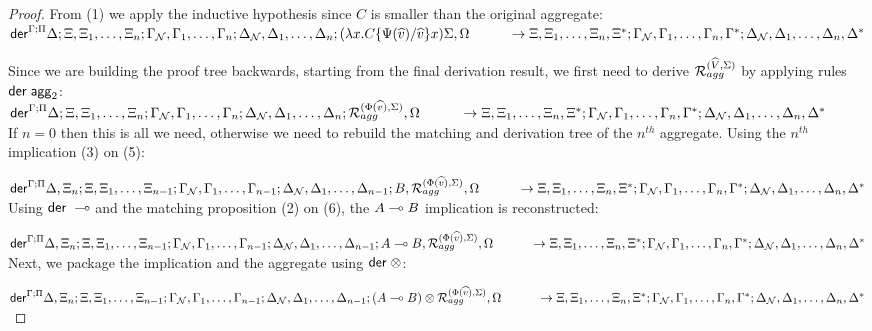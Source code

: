 \begin{proof}
\noindent From (1) we apply the inductive hypothesis since $C$ is smaller than
the original aggregate:\\
$\dz{\Gamma}{\Pi}{\Delta}{\Xi, \Xi_1, \dotsc, \Xi_n}{\gammanew, \Gamma_1,
\dotsc, \Gamma_n}{\deltanew, \Delta_1, \dotsc, \Delta_n}{
   (\lambda x.  C\{\Psi(\widehat{v})/\widehat{v}\} x) \Sigma,
   \Omega\\ \hspace*{1cm}}{\aggoutsem}$

\noindent Since we are building the proof tree backwards, starting from the final
derivation result, we first need to derive $\defstwo{agg}{\widehat{V}}{\Sigma}$ by applying rules
$\dzname \m{agg}_2$:\\
$\dz{\Gamma}{\Pi}{\Delta}{\Xi, \Xi_1, \dotsc, \Xi_n}{\gammanew, \Gamma_1,
\dotsc, \Gamma_n}{\deltanew, \Delta_1, \dotsc, \Delta_n}
{\defstwo{agg}{\Phi(\widehat{v})}{\Sigma}, \Omega \\ \hspace*{1cm}}{\aggoutsem}$ \\

\noindent If $n = 0$ then this is all we need, otherwise
we need to rebuild the matching and derivation tree of the
$n^{th}$ aggregate.  Using the $n^{th}$ implication (3) on (5):

\noindent $\dz{\Gamma}{\Pi}{\Delta, \Xi_n}{\Xi, \Xi_1, \dotsc, \Xi_{n-1}}{\gammanew, \Gamma_1,
\dotsc, \Gamma_{n-1}}{\deltanew, \Delta_1, \dotsc, \Delta_{n-1}}{B, \defstwo{agg}{\Phi(\widehat{v})}{\Sigma},
   \Omega \\ \hspace*{1cm}}{\aggoutsem}$ \\

\noindent Using $\dzname \lolli$ and the matching proposition (2) on (6), the $A \lolli B$
implication is reconstructed:

\noindent $\dz{\Gamma}{\Pi}{\Delta, \Xi_n}{\Xi, \Xi_1, \dotsc, \Xi_{n-1}}{\gammanew,
   \Gamma_1, \dotsc, \Gamma_{n-1}}{\deltanew, \Delta_1, \dotsc, \Delta_{n-1}}
{A \lolli B, \defstwo{agg}{\Phi(\widehat{v})}{\Sigma}, \Omega \\ \hspace*{1cm}}{\aggoutsem}$ \\

\noindent Next, we package the implication and the aggregate using $\dzname \otimes$:

\noindent $\dz{\Gamma}{\Pi}{\Delta, \Xi_n}{\Xi, \Xi_1, \dotsc, \Xi_{n-1}}{\gammanew,
\Gamma_1, \dotsc, \Gamma_{n-1}}{\deltanew, \Delta_1, \dotsc, \Delta_{n-1}}{
(A \lolli B) \otimes \defstwo{agg}{\Phi(\widehat{v})}{\Sigma}, \Omega \\
\hspace*{1cm}}{\aggoutsem}$ \\


\end{proof}
